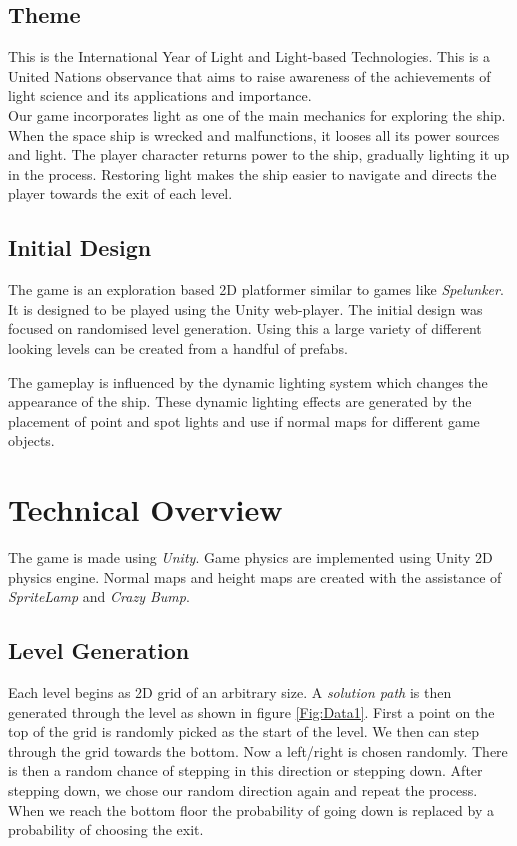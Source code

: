 \documentclass[11pt]{article}
\begin{document}
\subsection{Theme}
This is the International Year of Light and Light-based Technologies. This is a United Nations observance that aims to raise awareness of the achievements of light science and its applications and importance.\\

Our game incorporates light as one of the main mechanics for exploring the ship. When the space ship is wrecked and malfunctions, it looses all its power sources and light. The player character returns power to the ship, gradually lighting it up in the process. Restoring light makes the ship easier to navigate and directs the player towards the exit of each level.\\

\subsection{Initial Design}
The game is an exploration based 2D platformer similar to games like \textit{Spelunker}. It is designed to be played using the Unity web-player. The initial design was focused on randomised level generation. Using this a large variety of different looking levels can be created from a handful of prefabs.

The gameplay is influenced by the dynamic lighting system which changes the appearance of the ship. These dynamic lighting effects are generated by the placement of point and spot lights and use if normal maps for different game objects.

\section{Technical Overview}
The game is made using \textit{Unity}. Game physics are implemented using Unity 2D physics engine. Normal maps and height maps are created with the assistance of \textit{SpriteLamp} and \textit{Crazy Bump}.

\subsection{Level Generation}
Each level begins as 2D grid of an arbitrary size. A \textit{solution path} is then generated through the level as shown in figure \ref{Fig:Data1}. First a point on the top of the grid is randomly picked as the start of the level. We then can step through the grid towards the bottom. Now a left/right is chosen randomly. There is then a random chance of stepping in this direction or stepping down. After stepping down, we chose our random direction again and repeat the process. When we reach the bottom floor the probability of going down is replaced by a probability of choosing the exit.\\
\end{document}
